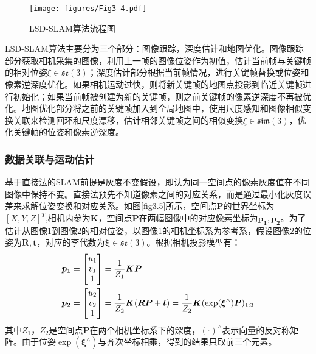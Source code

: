 \begin{figure}[h]
\centering
\texttt{[image: figures/Fig3-4.pdf]}
\caption{LSD-SLAM算法流程图}
\label{fig3.4}
\end{figure}
\vspace{-20pt}

LSD-SLAM算法主要分为三个部分：图像跟踪，深度估计和地图优化。图像跟踪部分获取相机采集的图像，利用上一帧的图像位姿作为初值，估计当前帧与关键帧的相对位姿$\xi \in \mathfrak{se}(3) $；深度估计部分根据当前帧情况，进行关键帧替换或位姿和像素逆深度优化。如果相机运动过快，则将新关键帧的地图点投影到临近关键帧进行初始化；如果当前帧被创建为新的关键帧，则之前关键帧的像素逆深度不再被优化。地图优化部分将之前的关键帧加入到全局地图中，使用尺度感知和图像相似变换关联来检测回环和尺度漂移，估计相邻关键帧之间的相似变换$\xi \in \mathfrak{sim}(3)$，优化关键帧的位姿和像素逆深度。

\subsubsection{数据关联与运动估计}
基于直接法的SLAM前提是灰度不变假设，即认为同一空间点的像素灰度值在不同图像中保持不变。直接法预先不知道像素之间的对应关系，而是通过最小化灰度误差来求解位姿变换和对应关系。如图\ref{fig3.5}所示，空间点$\boldsymbol{P}$的世界坐标为$[X,Y,Z]^T$,相机内参为$\boldsymbol{K}$，空间点$\boldsymbol{P}$在两幅图像中的对应像素坐标为$\boldsymbol{p_1},\boldsymbol{p_2}$。为了估计从图像1到图像2的相对位姿，以图像1的相机坐标系为参考系，假设图像2的位姿为$\boldsymbol{R},\boldsymbol{t}$，对应的李代数为$\boldsymbol{\xi} \in \mathfrak{se}(3) $。根据相机投影模型有：
\begin{equation}
\label{equ3.8}
\begin{aligned}
& \boldsymbol{p_1} = 
\begin{bmatrix}
u_1 \cr v_1 \cr 1 \cr 
\end{bmatrix}
={1 \over Z_1} \boldsymbol{K} \boldsymbol{P}
\\
& \boldsymbol{p_2} = 
\begin{bmatrix}
u_2 \cr v_2 \cr 1 \cr
\end{bmatrix}
={1 \over Z_2} \boldsymbol{K} ( \boldsymbol{R} \boldsymbol{P}+\boldsymbol{t}) = {1 \over Z_2} \boldsymbol{K} ( \exp (\boldsymbol{\xi}^{\wedge}) \boldsymbol{P})_{1:3}
\end{aligned}
\end{equation}
其中$Z_1$，$Z_2$是空间点$\boldsymbol{P}$在两个相机坐标系下的深度，$(\cdot)^{\wedge}$表示向量的反对称矩阵。由于位姿$\exp(\boldsymbol{\xi}^{\wedge})$与齐次坐标相乘，得到的结果只取前三个元素。

